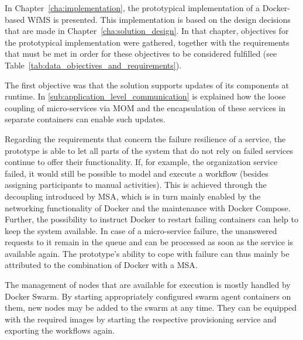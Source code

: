 
  In Chapter~\ref{cha:implementation}, the prototypical implementation of a Docker-based \ac{WfMS} is presented. This implementation is based on the design decisions that are made in Chapter~\ref{cha:solution_design}. In that chapter, objectives for the prototypical implementation were gathered, together with the requirements that must be met in order for these objectives to be considered fulfilled (see Table~\ref{tab:data_objectives_and_requirements}).


  The first objective was that the solution supports updates of its components at runtime.
  In \ref{sub:application_level_communication} is explained how the loose coupling of micro-services via \ac{MOM} and the encapsulation of these services in separate containers can enable such updates.

  Regarding the requirements that concern the failure resilience of a service, the prototype is able to let all parts of the system that do not rely on failed services continue to offer their functionality. If, for example, the organization service failed, it would still be possible to model and execute a workflow (besides assigning participants to manual activities). This is achieved through the decoupling introduced by \ac{MSA}, which is in turn mainly enabled by the networking functionality of Docker and the maintenance with Docker Compose. Further, the possibility to instruct Docker to restart failing containers can help to keep the system available. In case of a micro-service failure, the unanswered requests to it remain in the queue and can be processed as soon as the service is available again. The prototype's ability to cope with failure can thus mainly be attributed to the combination of Docker with a \ac{MSA}.

  The management of nodes that are available for execution is mostly handled by Docker Swarm. By starting appropriately configured swarm agent containers on them, new nodes may be added to the swarm at any time. They can be equipped with the required images by starting the respective provisioning service and exporting the workflows again.

